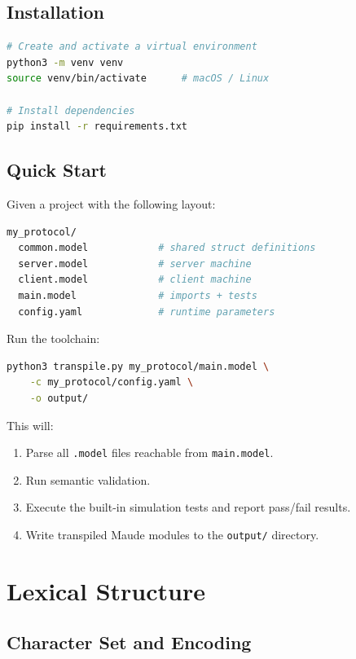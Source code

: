 \documentclass[11pt,letterpaper]{article}
\begin{document}
\subsection{Installation}
\begin{lstlisting}[language=bash,numbers=none]
# Create and activate a virtual environment
python3 -m venv venv
source venv/bin/activate      # macOS / Linux

# Install dependencies
pip install -r requirements.txt
\end{lstlisting}

\subsection{Quick Start}

Given a project with the following layout:

\begin{lstlisting}[language=bash,numbers=none]
my_protocol/
  common.model            # shared struct definitions
  server.model            # server machine
  client.model            # client machine
  main.model              # imports + tests
  config.yaml             # runtime parameters
\end{lstlisting}

Run the toolchain:

\begin{lstlisting}[language=bash,numbers=none]
python3 transpile.py my_protocol/main.model \
    -c my_protocol/config.yaml \
    -o output/
\end{lstlisting}

This will:
\begin{enumerate}
  \item Parse all \texttt{.model} files reachable from
        \texttt{main.model}.
  \item Run semantic validation.
  \item Execute the built-in simulation tests and report pass/fail
        results.
  \item Write transpiled Maude modules to the \texttt{output/}
        directory.
\end{enumerate}


\section{Lexical Structure}
\label{sec:lexical}

\subsection{Character Set and Encoding}
\end{document}
